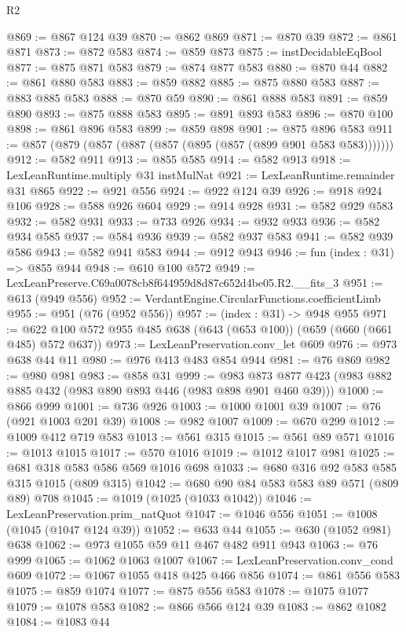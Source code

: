 \begin{lexlean}{R2}
\begin{coremodule}
@869 := @867 @124 @39
@870 := @862 @869
@871 := @870 @39
@872 := @861 @871
@873 := @872 @583
@874 := @859 @873
@875 := instDecidableEqBool
@877 := @875 @871 @583
@879 := @874 @877 @583
@880 := @870 @44
@882 := @861 @880 @583
@883 := @859 @882
@885 := @875 @880 @583
@887 := @883 @885 @583
@888 := @870 @59
@890 := @861 @888 @583
@891 := @859 @890
@893 := @875 @888 @583
@895 := @891 @893 @583
@896 := @870 @100
@898 := @861 @896 @583
@899 := @859 @898
@901 := @875 @896 @583
@911 := @857 (@879 (@857 (@887 (@857 (@895 (@857 (@899 @901 @583 @583)))))))
@912 := @582 @911
@913 := @855 @585
@914 := @582 @913
@918 := LexLeanRuntime.multiply @31 instMulNat
@921 := LexLeanRuntime.remainder @31 @865
@922 := @921 @556
@924 := @922 @124 @39
@926 := @918 @924 @106
@928 := @588 @926 @604
@929 := @914 @928
@931 := @582 @929 @583
@932 := @582 @931
@933 := @733 @926
@934 := @932 @933
@936 := @582 @934 @585
@937 := @584 @936
@939 := @582 @937 @583
@941 := @582 @939 @586
@943 := @582 @941 @583
@944 := @912 @943
@946 := fun (index : @31) => @855 @944
@948 := @610 @100 @572
@949 := LexLeanPreserve.C69a0078cb8f644959d8d87c652d4be05.R2.__fits_3
@951 := @613 (@949 @556)
@952 := VerdantEngine.CircularFunctions.coefficientLimb
@955 := @951 (@76 (@952 @556))
@957 := (index : @31) -> @948 @955
@971 := @622 @100 @572 @955 @485 @638 (@643 (@653 @100)) (@659 (@660 (@661 @485) @572 @637))
@973 := LexLeanPreservation.conv_let @609
@976 := @973 @638 @44 @11
@980 := @976 @413 @483 @854 @944
@981 := @76 @869
@982 := @980 @981
@983 := @858 @31
@999 := @983 @873 @877 @423 (@983 @882 @885 @432 (@983 @890 @893 @446 (@983 @898 @901 @460 @39)))
@1000 := @866 @999
@1001 := @736 @926
@1003 := @1000 @1001 @39
@1007 := @76 (@921 @1003 @201 @39)
@1008 := @982 @1007
@1009 := @670 @299
@1012 := @1009 @412 @719 @583
@1013 := @561 @315
@1015 := @561 @89 @571
@1016 := @1013 @1015
@1017 := @570 @1016
@1019 := @1012 @1017 @981
@1025 := @681 @318 @583 @586 @569 @1016 @698
@1033 := @680 @316 @92 @583 @585 @315 @1015 (@809 @315)
@1042 := @680 @90 @84 @583 @583 @89 @571 (@809 @89) @708
@1045 := @1019 (@1025 (@1033 @1042))
@1046 := LexLeanPreservation.prim_natQuot
@1047 := @1046 @556
@1051 := @1008 (@1045 (@1047 @124 @39))
@1052 := @633 @44
@1055 := @630 (@1052 @981) @638
@1062 := @973 @1055 @59 @11 @467 @482 @911 @943
@1063 := @76 @999
@1065 := @1062 @1063 @1007
@1067 := LexLeanPreservation.conv_cond @609
@1072 := @1067 @1055 @418 @425 @466 @856
@1074 := @861 @556 @583
@1075 := @859 @1074
@1077 := @875 @556 @583
@1078 := @1075 @1077
@1079 := @1078 @583
@1082 := @866 @566 @124 @39
@1083 := @862 @1082
@1084 := @1083 @44

\end{coremodule}
\end{lexlean}
